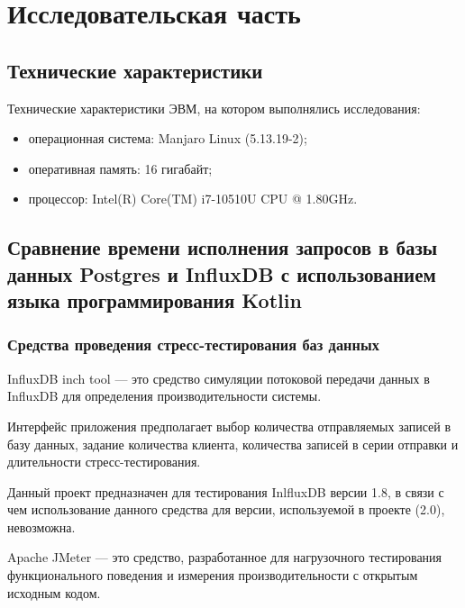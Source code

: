 \section{Исследовательская часть}

\subsection{Технические характеристики}

Технические характеристики ЭВМ, на котором выполнялись исследования:

\begin{itemize}[leftmargin=1.6\parindent, after=\vspace{5pt}]
\item операционная система: Manjaro Linux (5.13.19-2);
\item оперативная память: 16 гигабайт;
\item процессор: Intel(R) Core(TM) i7-10510U CPU @ 1.80GHz.
\end{itemize}

\subsection{Сравнение времени исполнения запросов в базы данных \newline Postgres и InfluxDB с использованием языка программирования Kotlin}

\subsubsection{Средства проведения стресс-тестирования баз данных}

InfluxDB inch tool \cite{inchTool} --- это средство симуляции потоковой передачи данных в InfluxDB для определения производительности системы.

Интерфейс приложения предполагает выбор количества отправляемых \newline записей в базу данных, задание количества клиента, количества \newline записей в серии отправки и длительности стресс-тестирования.

Данный проект предназначен для тестирования InlfluxDB версии 1.8, в связи с чем использование данного средства для версии, используемой в проекте (2.0), невозможна.

Apache JMeter \cite{jmeter} --- это средство, разработанное для нагрузочного тестирования функционального поведения и измерения производительности с открытым исходным кодом.

